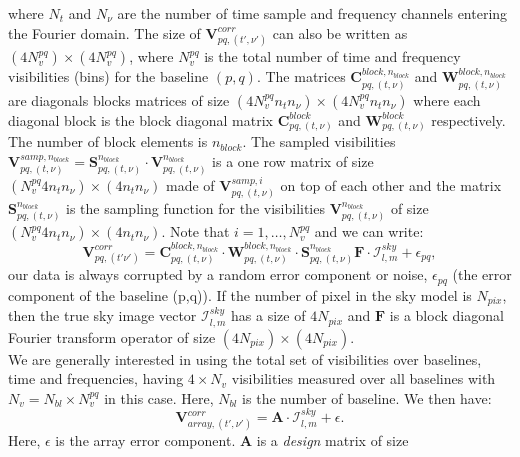\documentclass[useAMS,usenatbib]{mn2e}
\begin{document}
where $N_t$ and  $N_{\nu}$ are the number of time sample and frequency channels entering the Fourier domain. The size of 
$\mathbf{V}_{pq,(t',\nu')}^{corr}$ can also be written as $(4N_v^{pq})\times (4N_v^{pq})$, where $N_v^{pq}$ is the total
number of time and frequency visibilities (bins) for the baseline $(p,q)$. The matrices
$\mathbf{C}_{pq,(t,\nu)}^{block,n_{block}}$ and $\mathbf{W}_{pq,(t,\nu)}^{block,n_{block}}$ are diagonals blocks 
matrices of size $(4N_v^{pq}n_t n_{\nu})\times (4N_v^{pq}n_t n_{\nu})$ where each diagonal block is the block diagonal matrix  
$\mathbf{C}_{pq,(t,\nu)}^{block}$ and $\mathbf{W}_{pq,(t,\nu)}^{block}$ respectively. The number of block elements is $n_{block}$. The 
sampled  visibilities 
$\textbf{V}_{pq,(t,\nu)}^{samp,n_{block}}=\mathcal{\textbf{S}}_{pq,(t,\nu)}^{n_{block}}\cdot\mathbf{V}_{pq,(t,\nu)}^{n_{block}}$ is a one 
row matrix of size 
$(N_v^{pq}4 n_t n_{\nu})\times (4 n_t n_{\nu})$ made of $\textbf{V}_{pq,(t,\nu)}^{samp,i}$ on top of each other and the matrix 
$\mathcal{\textbf{S}}_{pq,(t,\nu)}^{n_{block}}$ is the sampling function for the visibilities $\mathbf{V}_{pq,(t,\nu)}^{n_{block}}$ of 
size $(N_v^{pq}4 n_t n_{\nu})\times (4 n_t n_{\nu})$. Note that $i=1,\dots, N_v^{pq}$ and we can write:
\begin{equation}
\mathbf{V}_{pq,(t' \nu')}^{corr}= 
\mathbf{C}_{pq,(t,\nu)}^{block,n_{block}}\cdot\mathbf{W}_{pq,(t,\nu)}^{block,n_{block}}\cdot 
\mathbf{S}_{pq,(t,\nu)}^{n_{block}}\mathbf{F}\cdot\mathcal{I}_{l,m}^{sky }+\epsilon_{pq},\label{eqv:linear}
\end{equation}
our data is always corrupted by a random error component or noise, $\epsilon_{pq}$ (the error component of the baseline (p,q)).
If the number of pixel in the sky model is $N_{pix}$, then the true sky image vector $\mathcal{I}_{l,m}^{sky}$ has a size of $4N_{pix}$ and 
$\textbf{F}$ is a block diagonal Fourier transform operator of size $(4N_{pix})\times(4N_{pix})$.\\
We are generally interested in using the total set of visibilities over baselines, time and frequencies, having $4\times N_v$ visibilities 
measured over all baselines with $N_v=N_{bl}\times N_v^{pq}$ in this case. Here, $N_{bl}$ is the number of baseline. We then have:
\begin{equation}
 \mathbf{V}_{array,(t',\nu')}^{corr}=\mathbf{A}\cdot\mathcal{I}_{l,m}^{sky} + \epsilon. \label{eq:vall}
\end{equation}
 Here, $\epsilon$ is the array error component. $\mathbf{A}$ is a \textit{design} matrix of size 
\end{document}
